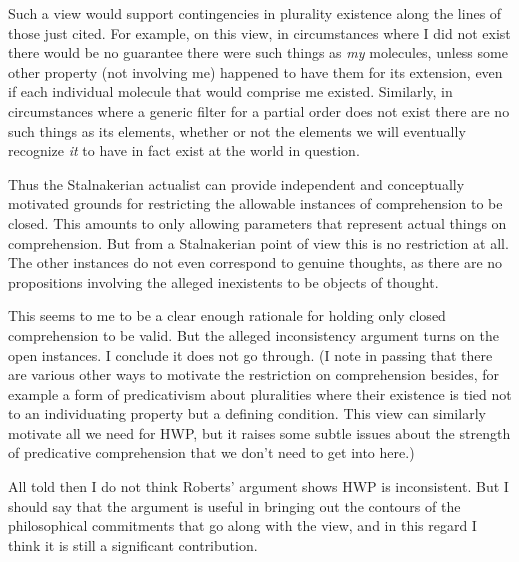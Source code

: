 \documentclass{article}
\begin{document}
Such a view would support
contingencies in plurality existence along the lines of 
those just cited. For example, on this view, 
in circumstances where 
I did not exist there would be no guarantee there 
were such things as \emph{my} molecules,
unless some other property (not involving me) happened 
to have them for its extension, even if each individual molecule 
that would comprise me existed. 
Similarly, 
in circumstances where a generic filter
for a partial order does not exist there are no such things 
as its elements, whether or not the elements we will eventually 
recognize \emph{it} to have in fact exist at the world in question.

Thus the Stalnakerian actualist 
can provide independent and conceptually motivated grounds 
for restricting the allowable instances of comprehension to be closed. This amounts 
to only allowing parameters that represent actual things on comprehension. But from 
a Stalnakerian point of view this is no restriction at all. The other instances 
do not even correspond to genuine thoughts, as there are no propositions involving 
the alleged inexistents to be objects of thought.

This seems to me to be a clear enough rationale for holding only closed comprehension 
to be valid. But the alleged inconsistency argument turns on the open instances.
I conclude it does not go through. (I note in passing that there are 
various other ways to motivate the restriction on comprehension besides,
for example a form of predicativism about pluralities where their existence 
is tied not to an individuating property but a defining condition. This 
view can similarly motivate all we need for HWP, but it raises some subtle issues 
about the strength of predicative comprehension that we don't need to get 
into here.)

All told then I do not think Roberts' argument shows HWP is inconsistent.
But I should say that the argument is useful 
in bringing out the contours of the philosophical commitments that go along 
with the view, and in this regard I think it is still a significant contribution.
\end{document}
